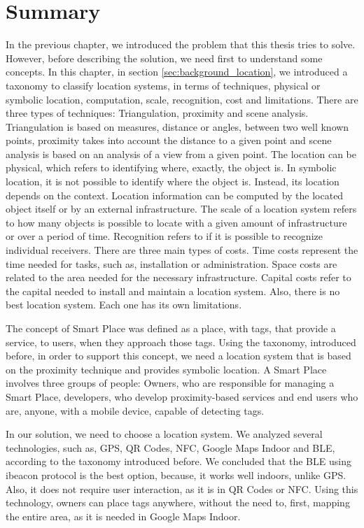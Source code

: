 \section{Summary}
\label{sec:background_summary}
In the previous chapter, we introduced the problem that this thesis tries to solve.
However, before describing the solution, we need first to understand some concepts.
In this chapter, in section \ref{sec:background_location}, we introduced a taxonomy to classify location systems, in terms of techniques, physical or symbolic location, computation, scale, recognition, cost and limitations.
There are three types of techniques: Triangulation, proximity and scene analysis.
Triangulation is based on measures, distance or angles, between two well known points, proximity takes into account the distance to a given point and scene analysis is based on an analysis of a view from a given point.
The location can be physical, which refers to identifying where, exactly, the object is. In symbolic location, it is not possible to identify where the object is. Instead, its location depends on the context.
Location information can be computed by the located object itself or by an external infrastructure.
The scale of a location system refers to how many objects is possible to locate with a given amount of infrastructure or over a period of time.
Recognition refers to if it is possible to recognize individual receivers.
There are three main types of costs.
Time costs represent the time needed for tasks, such as, installation or administration.
Space costs are related to the area needed for the necessary infrastructure. Capital costs refer to the capital needed to install and maintain a location system.
Also, there is no best location system. Each one has its own limitations.

The concept of Smart Place was defined as a place, with tags, that provide a service, to users, when they approach those tags.
Using the taxonomy, introduced before, in order to support this concept, we need a location system that is based on the proximity technique and provides symbolic location.
A Smart Place involves three groups of people: Owners, who are responsible for managing a Smart Place, developers, who develop proximity-based services and end users who are, anyone, with a mobile device, capable of detecting tags.

In our solution, we need to choose a location system.
We analyzed several technologies, such as, \gls{GPS}, \gls{QR} Codes, \gls{NFC}, Google Maps Indoor and \gls{BLE}, according to the taxonomy introduced before.
We concluded that the \gls{BLE} using ibeacon protocol is the best option, because, it works well indoors, unlike \gls{GPS}.
Also, it does not require user interaction, as it is in \gls{QR} Codes or \gls{NFC}.
Using this technology, owners can place tags anywhere, without the need to, first, mapping the entire area, as it is needed in Google Maps Indoor.

